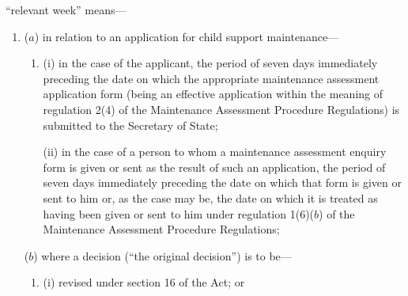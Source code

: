 \documentclass[12pt,a4paper]{article}
\begin{document}
\begin{enumerate}
%

    “relevant week” means—
\begin{enumerate}\item[]
    ($a$)
    in relation to an application for child support maintenance—
\begin{enumerate}\item[]
    (i)
    in the case of the applicant, the period of seven days immediately preceding the date on which the appropriate maintenance assessment application form (being an effective application within the meaning of regulation 2(4) of the Maintenance Assessment Procedure Regulations) is submitted to the Secretary of State;

    (ii)
    in the case of a person to whom a maintenance assessment enquiry form is given or sent as the result of such an application, the period of seven days immediately preceding the date on which that form is given or sent to him or, as the case may be, the date on which it is treated as having been given or sent to him under regulation 1(6)($b$) of the Maintenance Assessment Procedure Regulations;
\end{enumerate}

    ($b$)
    where a decision (“the original decision”) is to be—
\begin{enumerate}\item[]
    (i)
    revised under section 16 of the Act; or


\end{enumerate}
\end{enumerate}
\end{enumerate}
\end{document}
